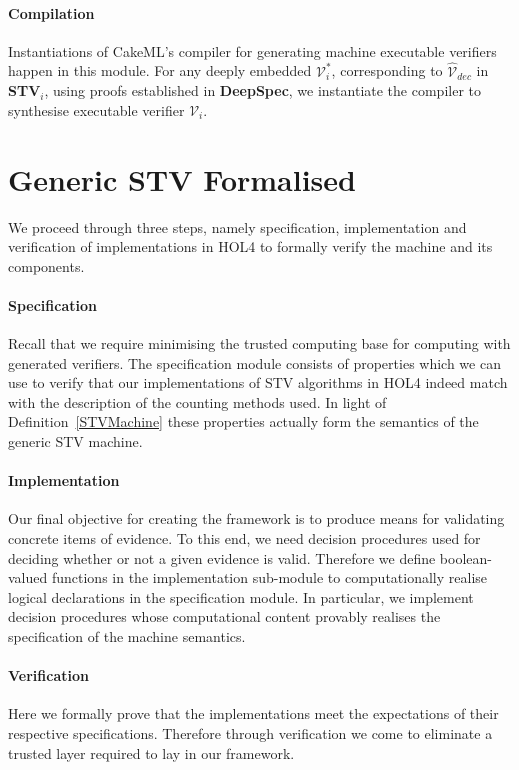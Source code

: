 \documentclass[10pt,conference]{IEEEtran}
\begin{document}
\paragraph*{\textbf{Compilation}} 
Instantiations of CakeML's  compiler for generating machine executable verifiers happen in this module. For any deeply embedded $\mathcal{V}^{*}_{i}$, corresponding to $\hat{\mathcal{V}}_{dec}$ in \textbf{STV}$_{i}$, using proofs  established in \textbf{DeepSpec}, we instantiate the compiler to synthesise executable  verifier $\mathcal{V}_{i}$.  
\section{Generic STV Formalised}\label{sec:GenCertVer}
We proceed through three steps, namely specification, implementation and verification of implementations in HOL4 to formally verify the machine and its components.
\paragraph*{Specification}  
Recall that we require minimising the trusted computing base  for computing with generated verifiers. The specification module consists of properties which we can use to verify that our implementations of  STV algorithms in HOL4 indeed match with the description of the counting methods used.  
 In light of Definition~\ref{STVMachine} these properties   actually form the semantics of the generic STV machine.   
\paragraph*{Implementation} Our final objective for creating the
framework is to produce means for validating concrete items of evidence. To this end, we need decision procedures used for deciding whether or not a given evidence is valid. Therefore we define boolean-valued functions in the implementation sub-module to computationally realise logical declarations in the specification module. In particular, we implement decision procedures whose computational content  provably realises the specification of the machine semantics.  
\paragraph*{Verification} Here we formally prove that the implementations meet the expectations of their respective specifications. Therefore through verification we come to eliminate a trusted layer  required to lay in our framework.  
\end{document}
